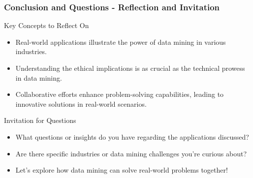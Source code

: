 \documentclass{beamer}
\begin{document}
\begin{frame}[fragile]
    \frametitle{Conclusion and Questions - Reflection and Invitation}

    \begin{block}{Key Concepts to Reflect On}
        \begin{itemize}
            \item Real-world applications illustrate the power of data mining in various industries.
            \item Understanding the ethical implications is as crucial as the technical prowess in data mining.
            \item Collaborative efforts enhance problem-solving capabilities, leading to innovative solutions in real-world scenarios.
        \end{itemize}
    \end{block}

    \begin{block}{Invitation for Questions}
        \begin{itemize}
            \item What questions or insights do you have regarding the applications discussed?
            \item Are there specific industries or data mining challenges you're curious about?
            \item Let’s explore how data mining can solve real-world problems together!
        \end{itemize}
    \end{block}
\end{frame}
\end{document}
